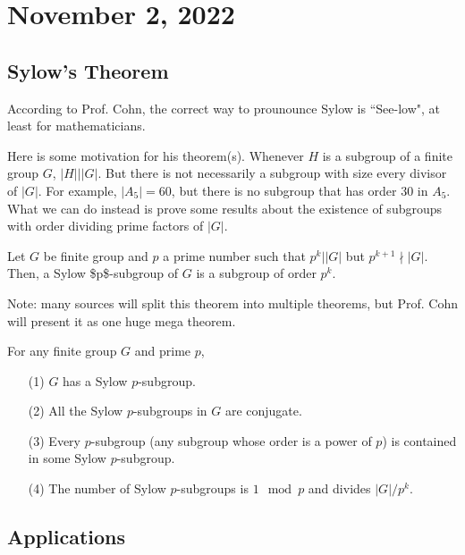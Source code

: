 \section{November 2, 2022}

\subsection{Sylow's Theorem}

According to Prof. Cohn, the correct way to prounounce Sylow is ``See-low", at least for mathematicians. 

Here is some motivation for his theorem(s). Whenever $H$ is a subgroup of a finite group $G$, $\vert H\vert \mid \vert G\vert$. But there is not necessarily a subgroup with size every divisor of $\vert G\vert$. For example, $\vert A_5\vert = 60$, but there is no subgroup that has order $30$ in $A_5$. What we can do instead is prove some results about the existence of subgroups with order dividing prime factors of $\vert G\vert$. 

\begin{definition}

Let $G$ be finite group and $p$ a prime number such that $p^k\mid \vert G\vert$ but $p^{k+1}\nmid \vert G\vert$. Then, a \ac{Sylow $p$-subgroup} of $G$ is a subgroup of order $p^k$.

\end{definition}

Note: many sources will split this theorem into multiple theorems, but Prof. Cohn will present it as one huge mega theorem.
\begin{theorem}

For any finite group $G$ and prime $p$, 
\begin{enumerate}
    \item [(1)] $G$ has a Sylow $p$-subgroup.
    \item [(2)] All the Sylow $p$-subgroups in $G$ are conjugate.
    \item [(3)] Every $p$-subgroup (any subgroup whose order is a power of $p$) is contained in some Sylow $p$-subgroup. 
    \item [(4)] The number of Sylow $p$-subgroups is $1\mod{p}$ and divides $\vert G\vert / p^k$.
\end{enumerate}
\end{theorem}

\subsection{Applications}

